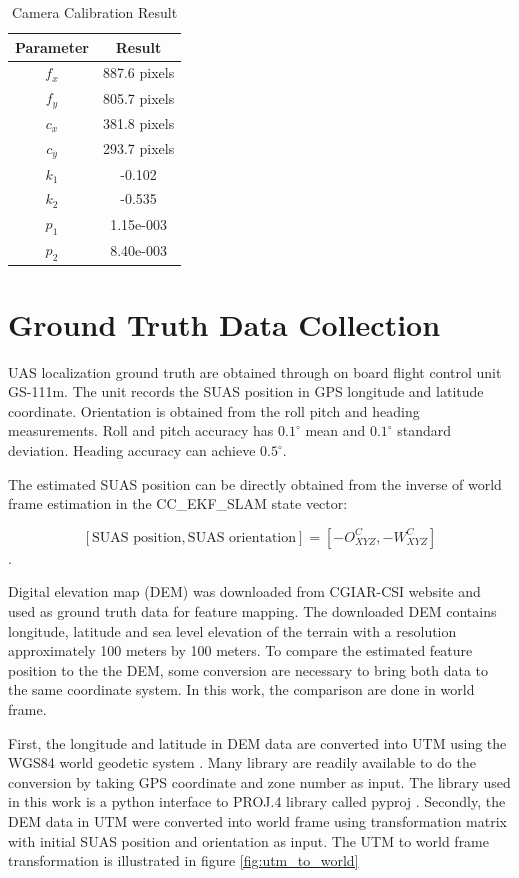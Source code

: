 \begin{table}[h]
\caption{Camera Calibration Result}
\label{tab:camcalresult}
\centering
\begin{tabular}{|c|c|}
\hline
Parameter & Result\\ \hline
$f_x$ & 887.6 pixels \\ \hline
$f_y$ & 805.7 pixels\\ \hline
$c_x$ & 381.8 pixels\\ \hline
$c_y$ & 293.7 pixels\\ \hline
$k_1$ & -0.102 \\ \hline
$k_2$ & -0.535 \\ \hline
$p_1$ & 1.15e-003 \\ \hline
$p_2$ & 8.40e-003 \\
\hline
\end{tabular}
\end{table}
\FloatBarrier

\section{Ground Truth Data Collection}

UAS localization ground truth are obtained through on board flight
control unit GS-111m. The unit records the SUAS position in GPS
longitude and latitude coordinate. Orientation is obtained from the
roll pitch and heading measurements. Roll and pitch accuracy has
$0.1^\circ$ mean and $0.1^\circ$ standard deviation. Heading accuracy can
achieve $0.5^\circ$.\cite{_athena_????}

The estimated SUAS position can be directly obtained from the inverse
of world frame estimation in the CC\_EKF\_SLAM state vector:

$$[\text{SUAS position}, \text{SUAS orientation}] = 
[-O_{XYZ}^{C}, -W_{XYZ}^{C}]$$.

Digital elevation map (DEM) was downloaded from CGIAR-CSI website
\cite{_cgiar-csi_????} and used as ground truth data for feature
mapping. The downloaded DEM contains longitude, latitude and sea level
elevation of the terrain with a resolution approximately 100 meters by
100 meters. To compare the estimated feature position to the the DEM, some
conversion are necessary to bring both data to the same coordinate
system. In this work, the comparison are done in world frame. 

First, the longitude and latitude in DEM data are converted into UTM
using the WGS84 world geodetic system \cite{_world_????}. Many library
are readily available to do the conversion by taking GPS coordinate
and zone number as input. The library used in this work is a python
interface to PROJ.4 library \cite{_pyproj_????} called pyproj
\cite{_pyproj_????}. Secondly, the DEM data in UTM were converted into
world frame using transformation matrix with initial SUAS position and
orientation as input. The UTM to world frame transformation is
illustrated in figure \ref{fig:utm_to_world}

